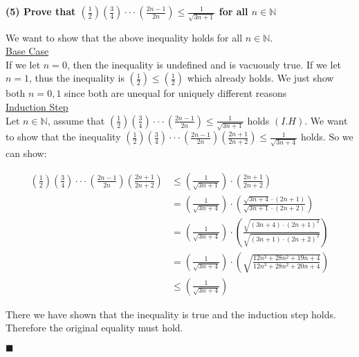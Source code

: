 \documentclass[20pt]{article}
\begin{document}
\noindent
\textbf{(5) Prove that $(\frac{1}{2}) (\frac{3}{4}) \cdot\cdot\cdot (\frac{2n-1}{2n}) \leq \frac{1}{\sqrt{3n+1}}$ for all $n\in \mathbb{N}$}\\
\begin{text}
    We want to show that the above inequality holds for all $n \in \mathbb{N}$.\\
    
    \noindent
    \underline{Base Case}\\
    If we let $n = 0$, then the inequality is undefined and is vacuously true. If we let $n = 1$, thus the inequality is $(\frac{1}{2}) \leq (\frac{1}{2})$ which already holds. We just show both $n = 0,1$ since both are unequal for uniquely different reasons\\
    
    \noindent
    \underline{Induction Step}\\
    Let $n \in \mathbb{N}$, assume that $(\frac{1}{2}) (\frac{3}{4}) \cdot\cdot\cdot (\frac{2n-1}{2n}) \leq \frac{1}{\sqrt{3n+1}}$ holds $(I.H)$. We want to show that the inequality $(\frac{1}{2}) (\frac{3}{4}) \cdot\cdot\cdot (\frac{2n-1}{2n}) (\frac{2n+1}{2n+2}) \leq \frac{1}{\sqrt{3n+4}}$ holds. So we can show:
    
    \begin{align}
        (\frac{1}{2}) (\frac{3}{4}) \cdot\cdot\cdot (\frac{2n-1}{2n}) (\frac{2n+1}{2n+2}) &\leq (\frac{1}{\sqrt{3n+1}}) \cdot (\frac{2n+1}{2n+2})\nonumber\\
        &= (\frac{1}{\sqrt{3n+4}}) \cdot (\frac{\sqrt{3n+4} \cdot (2n+1)}{\sqrt{3n+1} \cdot (2n+2)})\nonumber\\
        &= (\frac{1}{\sqrt{3n+4}}) \cdot (\frac{\sqrt{(3n+4) \cdot (2n+1)^2}}{\sqrt{(3n+1) \cdot (2n+2)^2}})\nonumber\\
        &= (\frac{1}{\sqrt{3n+4}}) \cdot (\sqrt{\frac{12n^3 + 28n^2 + 19n + 4}{12n^3 + 28n^2 + 20n + 4}})\nonumber\\
        &\leq (\frac{1}{\sqrt{3n+4}})\nonumber
    \end{align}
    
    \noindent
    There we have shown that the inequality is true and the induction step holds. Therefore the original equality must hold.
    
    \hfill $\blacksquare$
\end{text}\\
\end{document}
